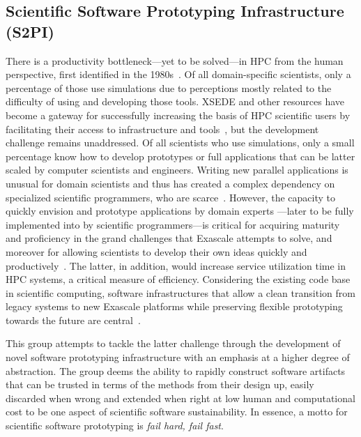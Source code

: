 \subsection{Scientific Software Prototyping Infrastructure (S2PI)}
\label{sec:prototyping}

There is a productivity bottleneck---yet to be solved---in HPC from the human
perspective, first identified in the 1980s~\cite{barstow1982automatic}. Of all
domain-specific scientists, only a percentage of those use simulations due to
perceptions mostly related to the difficulty of using and developing those tools.
XSEDE and other resources have become a gateway for successfully increasing the
basis of HPC scientific users by facilitating their access to infrastructure and
tools~\cite{towns2014xsede}, but the development challenge remains unaddressed.
Of all scientists who use simulations, only a small percentage know how
to develop prototypes or full applications that can be latter scaled by computer
scientists and engineers. Writing new parallel applications is unusual for
domain scientists and thus has created a complex dependency on specialized
scientific programmers, who are scarce~\cite{post2005computational}. However,
 the capacity to quickly envision and prototype applications by domain experts
 ---later to be fully implemented into by scientific programmers---is critical for
 acquiring maturity and proficiency in the grand challenges that Exascale
 attempts to solve, and moreover for allowing scientists to develop their own
 ideas quickly and productively~\cite{vinter2015prototyping}. The latter, in
 addition, would increase service utilization time in HPC systems, a critical
measure of efficiency. Considering the existing code base in scientific
computing, software infrastructures that allow a clean transition from legacy
systems to new Exascale platforms while preserving flexible prototyping
 towards the future are central~\cite{hwu2015transitioning}.

This group attempts to tackle the latter challenge through the development of
novel software prototyping infrastructure with an emphasis at a higher degree
of abstraction. The group deems the ability to rapidly construct software artifacts that can be
trusted in terms of the methods from their design up, easily discarded when
wrong and extended when right at low human and computational cost to be one
aspect of scientific software sustainability. In essence,
a motto for scientific software prototyping is \textit{fail hard, fail fast}.

